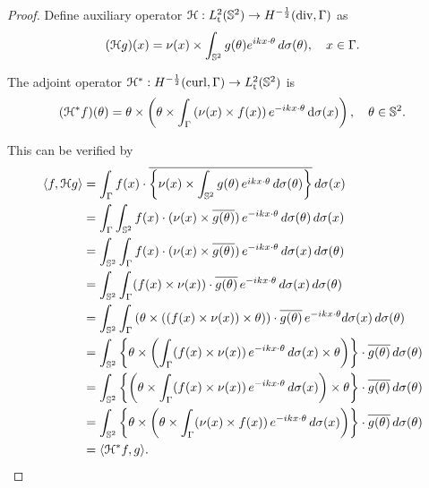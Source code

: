 \begin{proof}
  Define auxiliary operator $\mathcal{H}:L_\text{t}^2(\mathbb{S}^2)\rightarrow H^{-\frac{1}{2}}(\operatorname{div}, \Gamma)$ as
  \begin{align}
    (\mathcal{H}g)(x)=\nu(x)\times\int_{\mathbb{S}^2}g(\theta)e^{ikx\cdot\theta}\,d\sigma(\theta),\quad x\in\Gamma.
  \end{align}

  The adjoint operator $\mathcal{H}^*:H^{-\frac{1}{2}}(\operatorname{curl}, \Gamma)\rightarrow L_\text{t}^2(\mathbb{S}^2)$ is 
  \begin{align}
    (\mathcal{H}^*f)(\theta)=\theta\times\left(\theta\times\int_{\Gamma}\left(\nu(x)\times f(x)\right)e^{-ik x\cdot\theta}\,\text{d}\sigma(x)\right),\quad\theta\in\mathbb{S}^2.
  \end{align}
  
  This can be verified by
  \begin{align*}
    \langle f, \mathcal{H}g\rangle &= \int_{\Gamma}f(x)\cdot\overline{\left\{\nu(x)\times\int_{\mathbb{S}^2}g(\theta)\,e^{i k x\cdot\theta}\,d\sigma(\theta)\right\}}\,d\sigma(x) \\
    &=\int_{\Gamma}\int_{\mathbb{S}^2} f(x)\cdot (\nu(x)\times\overline{g(\theta)})\,e^{-i k x\cdot\theta}\,d\sigma(\theta)\,d\sigma(x) \\
    &=\int_{\mathbb{S}^2}\int_{\Gamma} f(x)\cdot (\nu(x)\times\overline{g(\theta)})\,e^{-i k x\cdot\theta}\,d\sigma(x)\,d\sigma(\theta) \\
    &=\int_{\mathbb{S}^2}\int_{\Gamma}(f(x)\times \nu(x))\cdot\overline{g(\theta)}\,e^{-i k x\cdot\theta}\,d\sigma(x)\,d\sigma(\theta) \\
    &=\int_{\mathbb{S}^2}\int_{\Gamma} \left(\theta\times\left((f(x)\times \nu(x))\times\theta\right)\right)\cdot\overline{g(\theta)}\,e^{-i k x\cdot\theta} d\sigma(x)\,d\sigma(\theta) \\
    &=\int_{\mathbb{S}^2}\left\{\theta\times\left(\int_{\Gamma} (f(x)\times \nu(x))\,e^{-i k x\cdot\theta}\,d\sigma(x)\times\theta\right)\right\}\cdot\overline{g(\theta)}\,d\sigma(\theta) \\
    &=\int_{\mathbb{S}^2}\left\{\left(\theta\times\int_{\Gamma}(f(x)\times \nu(x))\,e^{-i k x\cdot\theta}\,d\sigma(x)\right)\times\theta\right\}\cdot\overline{g(\theta)}\,d\sigma(\theta) \\
    &=\int_{\mathbb{S}^2}\left\{\theta\times\left(\theta\times\int_{\Gamma}(\nu(x)\times f(x))\,e^{-i k x\cdot\theta}\,d\sigma(x)\right)\right\}\cdot\overline{g(\theta)}\,d\sigma(\theta) \\
    &=\langle\mathcal{H}^*f, g\rangle.
  \end{align*} 


\end{proof}
